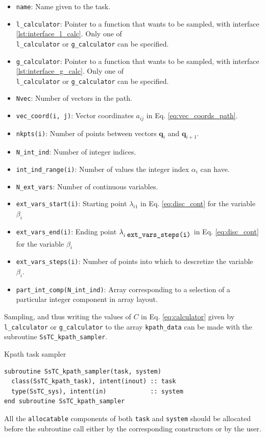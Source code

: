 \documentclass[10pt,a4paper]{article}
\begin{document}
\begin{tcolorbox}
\begin{itemize}
\item \verb|name|: Name given to the task.
\item \verb|l_calculator|: Pointer to a function that wants to be sampled, with interface \ref{lst:interface_l_calc}. Only one of \\ \verb|l_calculator| or \verb|g_calculator| can be specified.
\item \verb|g_calculator|: Pointer to a function that wants to be sampled, with interface \ref{lst:interface_g_calc}. Only one of \\ \verb|l_calculator| or \verb|g_calculator| can be specified.
\item \verb|Nvec|: Number of vectors in the path.
\item \verb|vec_coord(i, j)|: Vector coordinates $a_{ij}$ in Eq. \eqref{eq:vec_coords_path}.
\item \verb|nkpts(i)|: Number of points between vectors $\bm{q}_i$ and $\bm{q}_{i+1}$.
\item \verb|N_int_ind|: Number of integer indices.
\item \verb|int_ind_range(i)|: Number of values the integer index $\alpha_i$ can have.
\item \verb|N_ext_vars|: Number of continuous variables.
\item \verb|ext_vars_start(i)|: Starting point $\lambda_{i1}$ in Eq. \eqref{eq:disc_cont} for the variable $\beta_i$
\item \verb|ext_vars_end(i)|: Ending point $\lambda_{i\;\verb|ext_vars_steps(i)|}$ in Eq. \eqref{eq:disc_cont} for the variable $\beta_i$
\item \verb|ext_vars_steps(i)|: Number of points into which to descretize the variable $\beta_i$.
\item \verb|part_int_comp(N_int_ind)|: Array corresponding to a selection of a particular integer component in array layout.
\end{itemize}
\end{tcolorbox}
Sampling, and thus writing the values of $C$ in Eq. \eqref{eq:calculator} given by \verb|l_calculator| or \verb|g_calculator| to the array \verb|kpath_data| can be made with the subroutine \verb|SsTC_kpath_sampler|.
\begin{codebox}{Kpath task sampler}
\begin{lstlisting}[caption={Interface of the ``kpath" sampler.},captionpos=b]
subroutine SsTC_kpath_sampler(task, system)
  class(SsTC_kpath_task), intent(inout) :: task
  type(SsTC_sys), intent(in)            :: system
end subroutine SsTC_kpath_sampler
\end{lstlisting}
\end{codebox}
All the \verb|allocatable| components of both \verb|task| and \verb|system| should be allocated before the subroutine call either by the corresponding constructors or by the user.
\end{document}
